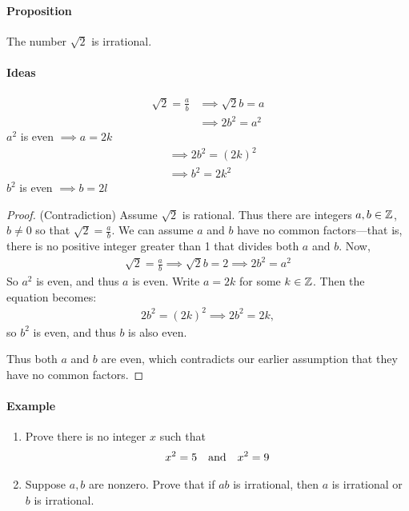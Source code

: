 \documentclass[../main.tex]{subfiles}
\begin{document}
\paragraph{Proposition} The number $\sqrt{2}$ is irrational.

\paragraph{Ideas}
\begin{align*}
    \sqrt{2} = \frac{a}{b} &\implies \sqrt{2} b = a \\
                           &\implies 2b^2 = a^2
\end{align*}
$a^2$ is even $\implies a = 2k$
\begin{align*}
    &\implies 2b^2 = (2k)^2 \\
    &\implies b^2 = 2k^2
\end{align*}
$b^2$ is even $\implies b = 2l$
\begin{proof}
    (Contradiction) Assume $\sqrt{2}$ is rational. Thus there are integers $a, b \in \mathbb{Z}$, $b \neq 0$
    so that $\sqrt{2} = \frac{a}{b}$. We can assume $a$ and $b$ have no common factors---that is,
    there is no positive integer greater than 1 that divides both $a$ and $b$. Now,
    \begin{align*}
        \sqrt{2} = \frac{a}{b} \implies \sqrt{2} b = 2 \implies 2b^2 = a^2
    \end{align*}
    So $a^2$ is even, and thus $a$ is even. Write $a = 2k$ for some $k \in \mathbb{Z}$. Then the equation
    becomes:
    \begin{align*}
        2b^2 = (2k)^2 \implies 2b^2 = 2k,
    \end{align*}
    so $b^2$ is even, and thus $b$ is also even. 

    Thus both $a$ and $b$ are even, which contradicts our earlier assumption that they have no
    common factors.
\end{proof}

\paragraph{Example}

\begin{enumerate}
    \item Prove there is no integer $x$ such that 
    \begin{align*}
        x^2 = 5 \qand x^2 = 9
    \end{align*}
    
    \item Suppose $a, b$ are nonzero. Prove that if $ab$ is irrational, then $a$ is irrational or 
    $b$ is irrational.
\end{enumerate}
\end{document}
